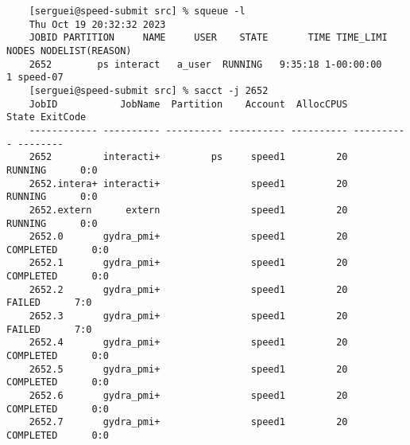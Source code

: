 \scriptsize
\begin{verbatim}
	[serguei@speed-submit src] % squeue -l
	Thu Oct 19 20:32:32 2023
	JOBID PARTITION     NAME     USER    STATE       TIME TIME_LIMI  NODES NODELIST(REASON)
	2652        ps interact   a_user  RUNNING   9:35:18 1-00:00:00      1 speed-07
	[serguei@speed-submit src] % sacct -j 2652
	JobID           JobName  Partition    Account  AllocCPUS      State ExitCode
	------------ ---------- ---------- ---------- ---------- ---------- --------
	2652         interacti+         ps     speed1         20    RUNNING      0:0
	2652.intera+ interacti+                speed1         20    RUNNING      0:0
	2652.extern      extern                speed1         20    RUNNING      0:0
	2652.0       gydra_pmi+                speed1         20  COMPLETED      0:0
	2652.1       gydra_pmi+                speed1         20  COMPLETED      0:0
	2652.2       gydra_pmi+                speed1         20     FAILED      7:0
	2652.3       gydra_pmi+                speed1         20     FAILED      7:0
	2652.4       gydra_pmi+                speed1         20  COMPLETED      0:0
	2652.5       gydra_pmi+                speed1         20  COMPLETED      0:0
	2652.6       gydra_pmi+                speed1         20  COMPLETED      0:0
	2652.7       gydra_pmi+                speed1         20  COMPLETED      0:0
\end{verbatim}
\normalsize